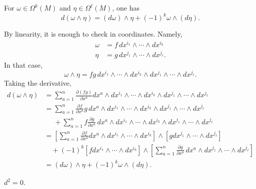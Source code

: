 \documentclass{ximera}
\begin{document}
    \begin{proposition}
        For $\omega \in \Omega ^k (M)$ and $\eta \in \Omega ^{\ell} (M)$, one has 
        \[    d (\omega \wedge \eta  ) = (d \omega ) \wedge \eta + (-1 ) ^k \omega \wedge  (d \eta).          \]
    \end{proposition}
    \begin{solution} By linearity, it is enough to check in coordinates. Namely, 
    \begin{align*}
        \omega & = f \, dx^{i_1} \wedge \cdots \wedge dx ^{i_k}\\
        \eta & = g \, dx^{j_1} \wedge \cdots \wedge dx ^{j_{\ell}}.
    \end{align*}
    In that case, 
    \[      \omega \wedge \eta = fg \, dx^{i_1} \wedge \cdots \wedge dx ^{i_k} \wedge dx^{j_1} \wedge \cdots \wedge dx ^{j_{\ell}}.                     \]
    Taking the derivative, 
    \begin{align*}
        d (\omega \wedge \eta ) & = \sum _{a = 1 }^n \frac{\partial (fg)}{\partial x ^a} dx ^a \wedge dx^{i_1} \wedge \cdots \wedge dx ^{i_k} \wedge dx^{j_1} \wedge \cdots \wedge dx ^{j_{\ell}} \\
        & = \sum _{a = 1 }^n   \frac{\partial f }{\partial x ^a} g \,   dx ^a \wedge dx^{i_1} \wedge \cdots \wedge dx ^{i_k} \wedge dx^{j_1} \wedge \cdots \wedge dx ^{j_{\ell}} \\
        &  \,\,\,\,\,\,\,\, +  \sum _{a = 1 }^n  f \frac{\partial g}{\partial x ^a}  \,  dx ^a \wedge dx^{i_1} \wedge \cdots \wedge dx ^{i_k} \wedge dx^{j_1} \wedge \cdots \wedge dx ^{j_{\ell}} \\
        & = \left[ \sum_{a = 1}^n  \frac{\partial f }{\partial x ^a}    dx ^a \wedge dx^{i_1} \wedge \cdots \wedge dx ^{i_k}  \right] \wedge \left[ g   dx^{j_1} \wedge \cdots \wedge dx ^{j_{\ell}}  \right]\\
        & \,\,\,\,\,\, + (-1) ^k  \left[ f  dx^{i_1} \wedge \cdots \wedge dx ^{i_k}   \right] \wedge \left[ \sum _{a = 1 }^n   \frac{\partial g}{\partial x ^a}  \,  dx ^a  \wedge dx^{j_1} \wedge \cdots \wedge dx ^{j_{\ell}}  \right] \\
        & = (d\omega) \wedge \eta + (-1)^k  \omega \wedge (d \eta)  . 
    \end{align*}        
    \end{solution}   


\begin{proposition}[Nilpotency]
    $d^2 = 0$.
\end{proposition}
\end{document}
